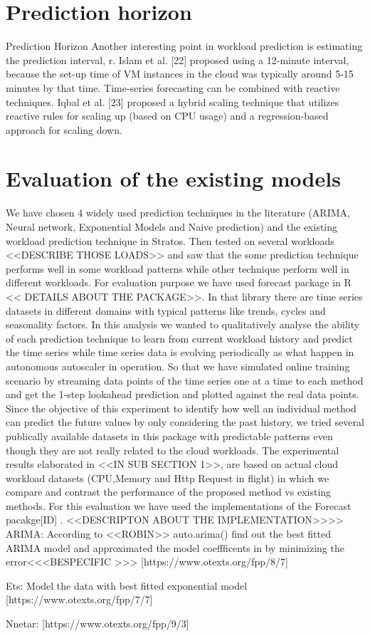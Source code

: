\section{Prediction horizon}

Prediction Horizon
Another interesting point in workload prediction is estimating the prediction interval, r. Islam et al. [22] proposed using a 12-minute interval, because the set-up time of VM instances in the cloud was typically around 5-15 minutes by that time. Time-series forecasting can be combined with reactive techniques. Iqbal et al. [23] proposed a hybrid scaling technique that utilizes reactive rules for scaling up (based on CPU usage) and a regression-based approach for scaling down.

\section{Evaluation of the existing models}

We have chosen 4 widely used prediction techniques in the literature (ARIMA, Neural network, Exponential Models and Naive prediction) and the existing workload prediction technique in Stratos. Then tested on several workloads <<DESCRIBE THOSE LOADS>> and saw that the some prediction technique performs well in some workload patterns while other technique perform well in different workloads.
For evaluation purpose we have used forecast package in R << DETAILS ABOUT THE PACKAGE>>. In that library there are time series datasets in different domains with typical patterns like trends, cycles and seasonality factors. In this analysis we wanted to qualitatively analyse the ability of each prediction technique to learn from current workload history and predict the time series while time series data is evolving periodically as what happen in autonomous autoscaler in operation. So that we have simulated online training scenario by streaming data points of the time series one at a time to each method and get the 1-step lookahead prediction and plotted against the real data points. Since the objective of this experiment to identify  how well an individual method can predict the future values by only considering the past history, we tried several publically available datasets in this package with predictable patterns even though they are not really related to the cloud workloads. The experimental results elaborated in <<IN SUB SECTION 1>>, are based on actual cloud workload datasets (CPU,Memory and Http Request in flight)  in which we  compare and contrast the performance of the proposed method vs existing methods. 
For this evaluation we have used the implementations of the Forecast pacakge[ID] . <<DESCRIPTON ABOUT THE IMPLEMENTATION>>>>
ARIMA: According to <<ROBIN>> auto.arima()  find out the best fitted ARIMA model and approximated the model coeffficents in by minimizing the error<<<BESPECIFIC >>> [https://www.otexts.org/fpp/8/7]

Ets: Model the data with best fitted exponential model [https://www.otexts.org/fpp/7/7]

	Nnetar: [https://www.otexts.org/fpp/9/3]

